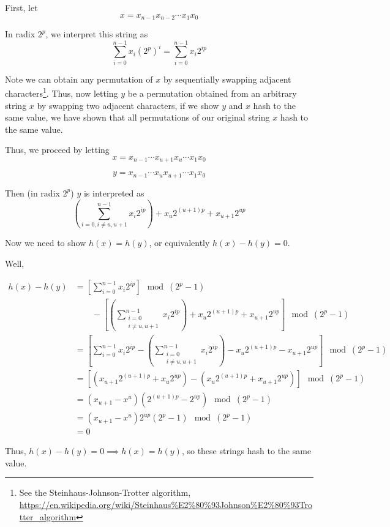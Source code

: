 \documentclass[paper=a4, fontsize=11pt]{scrartcl} %
\numberwithin{equation}{section} %
\numberwithin{figure}{section} %
\numberwithin{table}{section} %
\begin{document}
First, let
\[x = x_{n-1}x_{n-2} \cdots x_1 x_0\]

In radix $2^p$, we interpret this string as
\[\sum_{i = 0}^{n-1} x_i (2^p)^i = \sum_{i = 0}^{n - 1} x_i 2^{ip} \]

Note we can obtain any permutation of $x$ by sequentially swapping adjacent characters\footnote{See the Steinhaus-Johnson-Trotter algorithm, \url{https://en.wikipedia.org/wiki/Steinhaus\%E2\%80\%93Johnson\%E2\%80\%93Trotter\_algorithm}}. Thus, now letting $y$ be a permutation obtained from an arbitrary string $x$ by swapping two adjacent characters, if we show $y$ and $x$ hash to the same value, we have shown that all permutations of our original string $x$ hash to the same value.

Thus, we proceed by letting
\[x = x_{n-1}\cdots x_{u+1} x_u \cdots x_1 x_0\]

\[y = x_{n-1}\cdots x_{u} x_{u+1} \cdots x_1 x_0\]

Then (in radix $2^p$) $y$ is interpreted as
\[\left(\sum_{i = 0, i\ne u, u+1}^{n - 1} x_i 2^{ip} \right) + x_u 2^{(u+1)p} + x_{u+1}2^{up}\]

Now we need to show $h(x) = h(y)$, or equivalently $h(x) - h(y) = 0$.

Well,

\begin{align*}
h(x) - h(y) &= \left[\sum_{i = 0}^{n - 1} x_i 2^{ip}\right] \mod (2^p - 1) \\
	& \qquad{} - \left[\left(\sum_{\substack{i = 0\\ i\ne u, u+1}}^{n - 1} x_i 2^{ip} \right) + x_u 2^{(u+1)p} + x_{u+1}2^{up}\right] \mod (2^p - 1)  \\
	&=  \left[\sum_{i = 0}^{n - 1} x_i 2^{ip} - \left(\sum_{\substack{i = 0\\ i\ne u, u+1}}^{n - 1} x_i 2^{ip} \right) - x_u 2^{(u+1)p} - x_{u+1}2^{up}\right] \mod (2^p - 1)  \\
	&= \left[(x_{u+1} 2^{(u+1)p} + x_u 2^{up}) - (x_{u} 2^{(u+1)p} + x_{u+1} 2^{up}) \right] \mod (2^p -1) \\
	&= (x_{u+1} - x^u)(2^{(u+1)p} - 2^{up}) \mod (2^p -1) \\
	&= (x_{u+1} - x^u)2^{up}(2^p - 1) \mod (2^p -1) \\
	&= 0
\end{align*}

Thus, $h(x) - h(y) = 0 \implies h(x) = h(y)$, so these strings hash to the same value.


\end{document}
